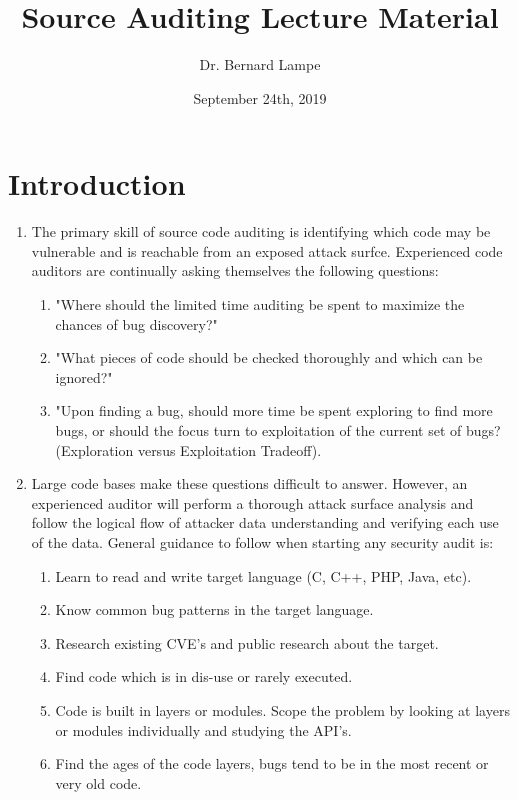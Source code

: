 \documentclass[12pt]{Training}
\title{Source Auditing Lecture Material}
\author{Dr. Bernard Lampe}
\institute{Raytheon CODEX}
\date{September 24th, 2019}
\begin{document}
\maketitle


\section*{Introduction}
\begin{enumerate}
	\item The primary skill of source code auditing is identifying which code may be vulnerable and is reachable from an exposed attack surfce. Experienced code auditors are continually asking themselves the following questions:
		\begin{enumerate}
			\item "Where should the limited time auditing be spent to maximize the chances of bug discovery?"
		 	\item "What pieces of code should be checked thoroughly and which can be ignored?"
		 	\item "Upon finding a bug, should more time be spent exploring to find more bugs, or should the focus turn to exploitation of the current set of bugs? (Exploration versus Exploitation Tradeoff).
		\end{enumerate}
	\item Large code bases make these questions difficult to answer. However, an experienced auditor will perform a thorough attack surface analysis and follow the logical flow of attacker data understanding and verifying each use of the data. General guidance to follow when starting any security audit is:
	\begin{enumerate}
		\item Learn to read and write target language (C, C++, PHP, Java, etc).
		\item Know common bug patterns in the target language.
		\item Research existing CVE's and public research about the target.
		\item Find code which is in dis-use or rarely executed.
		\item Code is built in layers or modules. Scope the problem by looking at layers or modules individually and studying the API's.
		\item Find the ages of the code layers, bugs tend to be in the most recent or very old code.

\end{enumerate}
\end{enumerate}
\end{document}
